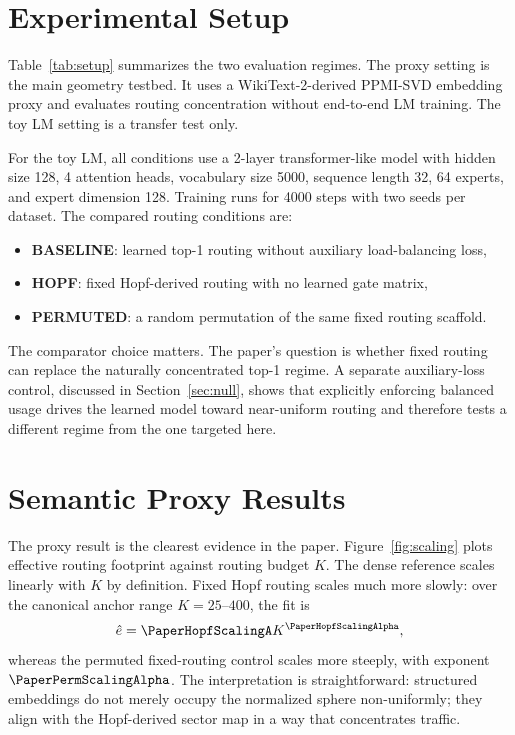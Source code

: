 \documentclass[10pt,twocolumn]{article}
\begin{document}
\section{Experimental Setup}
Table~\ref{tab:setup} summarizes the two evaluation regimes. The proxy setting is the main geometry testbed. It uses a WikiText-2-derived PPMI-SVD embedding proxy and evaluates routing concentration without end-to-end LM training. The toy LM setting is a transfer test only.

\begin{table}[t]
  \centering
  \caption{Evaluation regimes used in Paper 1.}
  \label{tab:setup}
  \footnotesize
  \resizebox{\columnwidth}{!}{}
\end{table}

For the toy LM, all conditions use a 2-layer transformer-like model with hidden size 128, 4 attention heads, vocabulary size 5000, sequence length 32, 64 experts, and expert dimension 128. Training runs for 4000 steps with two seeds per dataset. The compared routing conditions are:
\begin{itemize}
\item \textbf{BASELINE}: learned top-1 routing without auxiliary load-balancing loss,
\item \textbf{HOPF}: fixed Hopf-derived routing with no learned gate matrix,
\item \textbf{PERMUTED}: a random permutation of the same fixed routing scaffold.
\end{itemize}

The comparator choice matters. The paper's question is whether fixed routing can replace the naturally concentrated top-1 regime. A separate auxiliary-loss control, discussed in Section~\ref{sec:null}, shows that explicitly enforcing balanced usage drives the learned model toward near-uniform routing and therefore tests a different regime from the one targeted here.

\section{Semantic Proxy Results}
The proxy result is the clearest evidence in the paper. Figure~\ref{fig:scaling} plots effective routing footprint against routing budget $K$. The dense reference scales linearly with $K$ by definition. Fixed Hopf routing scales much more slowly: over the canonical anchor range $K=25$--$400$, the fit is
\[
\hat{e} = \PaperHopfScalingA K^{\PaperHopfScalingAlpha},
\]
whereas the permuted fixed-routing control scales more steeply, with exponent $\PaperPermScalingAlpha$. The interpretation is straightforward: structured embeddings do not merely occupy the normalized sphere non-uniformly; they align with the Hopf-derived sector map in a way that concentrates traffic.
\end{document}
